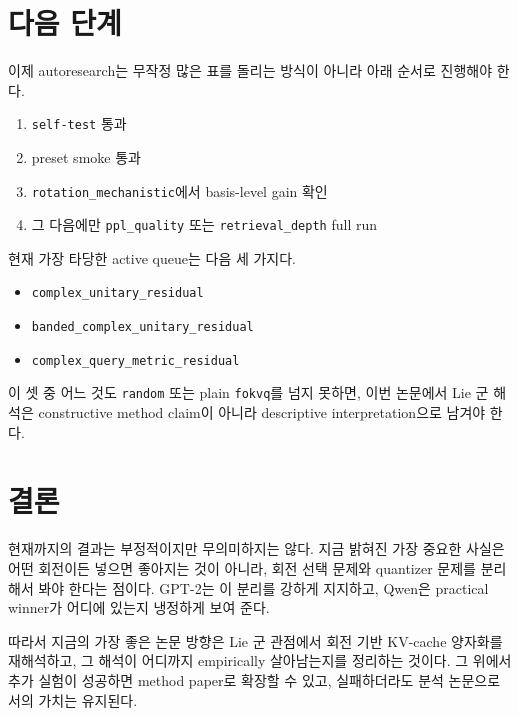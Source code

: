 \documentclass[11pt,a4paper]{article}
\begin{document}
\section{다음 단계}

이제 autoresearch는 무작정 많은 표를 돌리는 방식이 아니라 아래 순서로 진행해야 한다.

\begin{enumerate}
\item \texttt{self-test} 통과
\item preset smoke 통과
\item \texttt{rotation\_mechanistic}에서 basis-level gain 확인
\item 그 다음에만 \texttt{ppl\_quality} 또는 \texttt{retrieval\_depth} full run
\end{enumerate}

현재 가장 타당한 active queue는 다음 세 가지다.

\begin{itemize}
\item \texttt{complex\_unitary\_residual}
\item \texttt{banded\_complex\_unitary\_residual}
\item \texttt{complex\_query\_metric\_residual}
\end{itemize}

이 셋 중 어느 것도 \texttt{random} 또는 plain \texttt{fokvq}를 넘지 못하면, 이번 논문에서 Lie 군 해석은 constructive method claim이 아니라 descriptive interpretation으로 남겨야 한다.

\section{결론}

현재까지의 결과는 부정적이지만 무의미하지는 않다. 지금 밝혀진 가장 중요한 사실은 어떤 회전이든 넣으면 좋아지는 것이 아니라, 회전 선택 문제와 quantizer 문제를 분리해서 봐야 한다는 점이다. GPT-2는 이 분리를 강하게 지지하고, Qwen은 practical winner가 어디에 있는지 냉정하게 보여 준다.

따라서 지금의 가장 좋은 논문 방향은 Lie 군 관점에서 회전 기반 KV-cache 양자화를 재해석하고, 그 해석이 어디까지 empirically 살아남는지를 정리하는 것이다. 그 위에서 추가 실험이 성공하면 method paper로 확장할 수 있고, 실패하더라도 분석 논문으로서의 가치는 유지된다.
\end{document}
